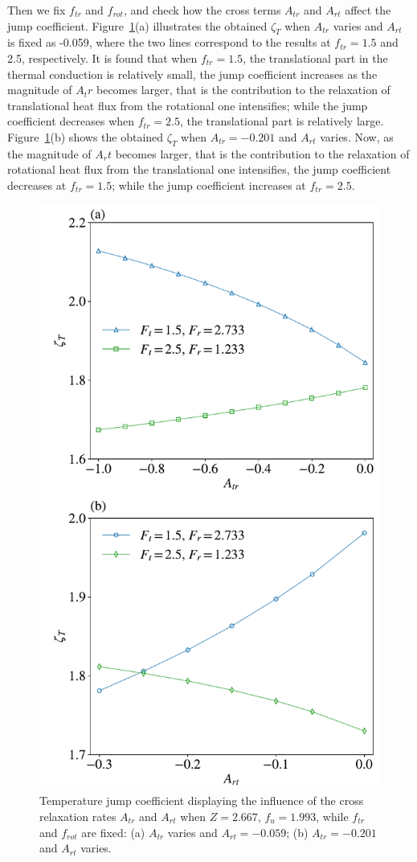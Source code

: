 Then we fix $f_{tr}$ and $f_{rot}$, and check how the cross terms $A_{tr}$ and $A_{rt}$ affect the jump coefficient. Figure~\ref{fig:TJC_QtQr}(a) illustrates the obtained $\zeta_T$ when $A_{tr}$ varies and $A_{rt}$ is fixed as -0.059, where the two lines correspond to the results at $f_{tr}=1.5$ and 2.5, respectively. It is found that when $f_{tr}=1.5$, the translational part in the thermal conduction is relatively small, the jump coefficient increases as the magnitude of $A_tr$ becomes larger, that is the contribution to the relaxation of translational heat flux from the rotational one intensifies; while the jump coefficient decreases when $f_{tr}=2.5$, the translational part is relatively large. Figure~\ref{fig:TJC_QtQr}(b) shows the obtained $\zeta_T$ when $A_{tr}=-0.201$  and $A_{rt}$ varies. Now, as the magnitude of $A_rt$ becomes larger, that is the contribution to the relaxation of rotational heat flux from the translational one intensifies, the jump coefficient decreases at $f_{tr}=1.5$; while the jump coefficient increases at $f_{tr}=2.5$.

\begin{figure}[t]
	\centering
	\includegraphics[width=0.4\columnwidth]{SlipJump/IMG/TJC_QtQr}%
	\caption{Temperature jump coefficient displaying the influence of the cross relaxation rates $A_{tr}$ and $A_{rt}$ when $Z=2.667$, $f_{u}=1.993$, while $f_{tr}$ and $f_{rot}$ are fixed: (a) $A_{tr}$ varies and $A_{rt}=-0.059$; (b) $A_{tr}=-0.201$ and $A_{rt}$ varies.}
	\label{fig:TJC_QtQr}
\end{figure}


